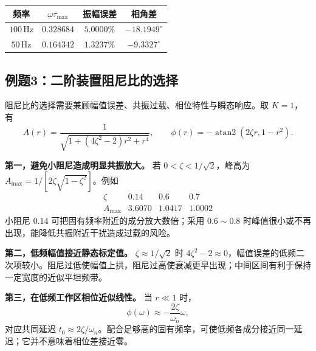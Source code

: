 \begin{table}[H]
\centering
\begin{tabular}{@{}c c c c@{}}
\toprule
频率 & $\omega\tau_{\max}$ & 振幅误差 & 相角差 \\
\midrule
$100\,\mathrm{Hz}$ & $0.328684$ & $5.0000\%$ & $-18.1949^\circ$ \\
$50\,\mathrm{Hz}$ & $0.164342$ & $1.3237\%$ & $-9.3327^\circ$ \\
\bottomrule
\end{tabular}
\end{table}


\Needspace{8cm}
\subsection{例题3：二阶装置阻尼比的选择}


\sol
阻尼比的选择需要兼顾幅值误差、共振过载、相位特性与瞬态响应。取 $K=1$，有
\[
A(r)=\frac{1}{\sqrt{1+(4\zeta^2-2)r^2+r^4}},\qquad
\phi(r)=-\operatorname{atan2}(2\zeta r,1-r^2).
\]

\textbf{第一，避免小阻尼造成明显共振放大。}
若 $0<\zeta<1/\sqrt2$，峰高为
$A_{\max}=1/[2\zeta\sqrt{1-\zeta^2}]$。例如
\[
\begin{array}{c|ccc}
\zeta & 0.14 & 0.6 & 0.7\\\hline
A_{\max} & 3.6070 & 1.0417 & 1.0002
\end{array}
\]
小阻尼 $0.14$ 可把固有频率附近的成分放大数倍；采用 $0.6\sim0.8$ 时峰值很小或不再出现，能降低共振附近干扰造成过载的风险。

\textbf{第二，低频幅值接近静态标定值。}
$\zeta\approx1/\sqrt2$ 时 $4\zeta^2-2\approx0$，幅值误差的低频二次项较小。阻尼过低使幅值上拱，阻尼过高使衰减更早出现；中间区间有利于保持一定宽度的近似平坦频带。

\textbf{第三，在低频工作区相位近似线性。}
当 $r\ll1$ 时，
\[
\phi(\omega)\approx-\frac{2\zeta}{\omega_n}\omega,
\]
对应共同延迟 $t_0\approx2\zeta/\omega_n$。配合足够高的固有频率，可使低频各成分接近同一延迟；它并不意味着相位差接近零。

